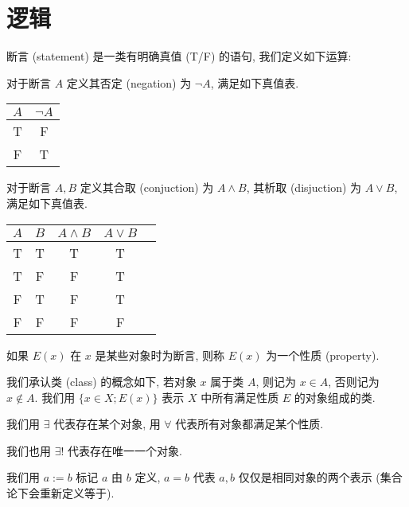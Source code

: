 \section{逻辑}

断言 (statement) 是一类有明确真值 (T/F) 的语句, 我们定义如下运算:

\begin{definition}
    对于断言 \(A\) 定义其否定 (negation) 为 \(\neg A\), 满足如下真值表.
    \begin{center}
        \begin{tabular}{|c|c|}
            \hline
            \(A\) & \(\neg A\) \\
            \hline
            T & F \\
            \hline
            F & T \\
            \hline
        \end{tabular}
    \end{center}

    对于断言 \(A, B\) 定义其合取 (conjuction) 为 \(A \land B\), 其析取 (disjuction) 为 \(A \lor B\), 满足如下真值表.

    \begin{center}
        \begin{tabular}{|c|c|c|c|c|}
            \hline
            \(A\) & \(B\) & \(A \land B\) & \(A \lor B\) \\
            \hline
            T & T & T & T \\
            \hline
            T & F & F & T \\
            \hline
            F & T & F & T \\
            \hline
            F & F & F & F \\
            \hline
        \end{tabular}
    \end{center}
\end{definition}

\begin{definition}
    如果 \(E(x)\) 在 \(x\) 是某些对象时为断言, 则称 \(E(x)\) 为一个性质 (property).
\end{definition}

我们承认类 (class) 的概念如下, 若对象 \(x\) 属于类 \(A\), 则记为 \(x \in A\), 否则记为 \(x \notin A\).
我们用 \(\{x \in X; E(x)\}\) 表示 \(X\) 中所有满足性质 \(E\) 的对象组成的类.

\begin{definition}
    我们用 \(\exists\) 代表存在某个对象, 用 \(\forall\) 代表所有对象都满足某个性质.

    我们也用 \(\exists !\) 代表存在唯一一个对象.

    我们用 \(a := b\) 标记 \(a\) 由 \(b\) 定义, \(a = b\) 代表 \(a, b\) 仅仅是相同对象的两个表示 (集合论下会重新定义等于).
\end{definition}

